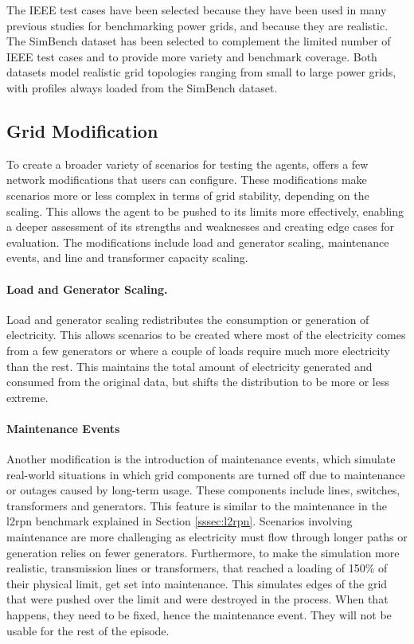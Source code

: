 The IEEE test cases have been selected because they have been used in many previous studies for benchmarking power grids, and because they are realistic. The SimBench dataset has been selected to complement the limited number of IEEE test cases and to provide more variety and benchmark coverage. Both datasets model realistic grid topologies ranging from small to large power grids, with profiles always loaded from the SimBench dataset.

\subsection{Grid Modification}\label{ssec:implementation-grid-mod}
To create a broader variety of scenarios for testing the agents, \benchmark offers a few network modifications that users can configure. These modifications make scenarios more or less complex in terms of grid stability, depending on the scaling. This allows the agent to be pushed to its limits more effectively, enabling a deeper assessment of its strengths and weaknesses and creating edge cases for evaluation. The modifications include load and generator scaling, maintenance events, and line and transformer capacity scaling.

\paragraph{Load and Generator Scaling.} Load and generator scaling redistributes the consumption or generation of electricity. This allows scenarios to be created where most of the electricity comes from a few generators or where a couple of loads require much more electricity than the rest. This maintains the total amount of electricity generated and consumed from the original data, but shifts the distribution to be more or less extreme.

\paragraph{Maintenance Events} Another modification is the introduction of maintenance events, which simulate real-world situations in which grid components are turned off due to maintenance or outages caused by long-term usage. These components include lines, switches, transformers and generators. This feature is similar to the maintenance in the \ac{l2rpn} benchmark explained in Section \ref{sssec:l2rpn}. Scenarios involving maintenance are more challenging as electricity must flow through longer paths or generation relies on fewer generators. Furthermore, to make the simulation more realistic, transmission lines or transformers, that reached a loading of 150\% of their physical limit, get set into maintenance. This simulates edges of the grid that were pushed over the limit and were destroyed in the process. When that happens, they need to be fixed, hence the maintenance event. They will not be usable for the rest of the episode. 

